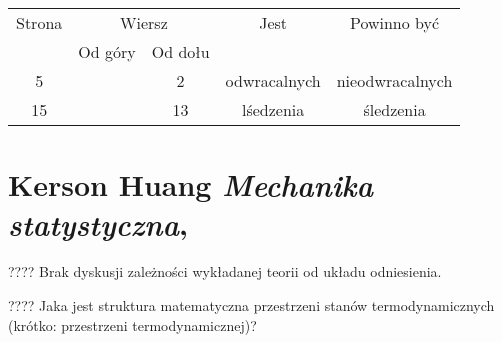 \documentclass[a4paper,11pt]{article}
\numberwithin{equation}{section}
\begin{document}
\begin{center}

  \begin{tabular}{|c|c|c|c|c|}
    \hline
    Strona & \multicolumn{2}{c|}{Wiersz} & Jest
                              & Powinno być \\ \cline{2-3}
    & Od góry & Od dołu & & \\
    \hline
    5   & &  2 & odwracalnych & nieodwracalnych \\
    15  & & 13 & lśedzenia & śledzenia \\
    \hline
  \end{tabular}

\end{center}

\VerSpaceTwo












\section{Kerson Huang \textit{Mechanika statystyczna},
  \cite{HuangMechanikaStatystyczna1987}}


\vspace{0em}



\vspace{0em}


\noindent
???? Brak dyskusji zależności wykładanej teorii od układu odniesienia.

\VerSpaceFour





\noindent
???? Jaka jest struktura matematyczna przestrzeni stanów termodynamicznych
(krótko: przestrzeni termodynamicznej)?
\end{document}
